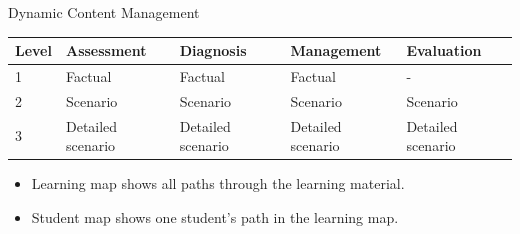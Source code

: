 \documentclass{beamer}
\begin{document}
\begin{frame}{Dynamic Content Management}
\begin{table}[h!]
\begin{tabular}{|m{2em}|m{6em}|m{6em}|m{6em}|m{6em}|}
	\hline
	 Level & Assessment & Diagnosis & Management & Evaluation \\
	\hline
	1  & Factual & Factual & Factual & - \\
	2 & Scenario & Scenario & Scenario & Scenario \\
	3 & Detailed scenario  & Detailed scenario & Detailed scenario & Detailed scenario \\
	\hline
\end{tabular}
\end{table}
\begin{itemize}
	\item Learning map shows all paths through the learning material.
	\item Student map shows one student's path in the learning map.
\end{itemize}
\end{frame}
\end{document}
